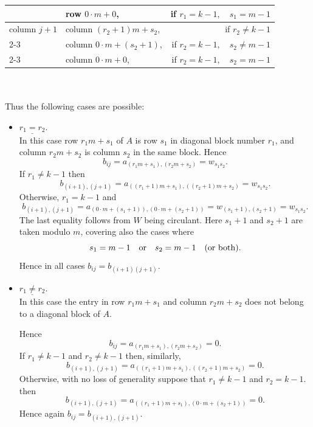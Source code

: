 {{{\begin{pr}
{\begin{tabular}{||l|lr||}
	       & row  $0 \cdot m+0$,   &  if $r_1=k-1, \quad s_1=m-1$         \\ \hline
  column $j+1$ & column  $(r_2+1)m+s_2$,     &  if $r_2 \neq k-1$    \\ \cline{2-3}
	       & column  $0 \cdot m+(s_2+1)$,&  if $r_2=k-1, \quad s_2 \neq m-1$          \\ \cline{2-3}
	       & column  $0 \cdot m+0$,&  if $r_2=k-1, \quad s_2=m-1$          \\ \hline
\end{tabular}
{ \ }\\
{ \ }\\
     
     Thus the following cases are possible:
	
\begin{itemize}
  \item $\underline {r_1=r_2}$.\\
	In this case row $r_1m+s_1$ of $A$ is row $s_1$ in diagonal block number 
	$r_1$, and column $r_2m+s_2$ is column $s_2$ in the same block.  
	Hence
		$$b_{ij}=a_{(r_1m+s_1),(r_2m+s_2)}=w_{s_1s_2}.$$
	If $r_1 \neq k-1$ then
		$$b_{(i+1),(j+1)}=a_{((r_1+1)m+s_1),((r_2+1)m+s_2)}=w_{s_1s_2}.$$           
	Otherwise,  $r_1=k-1$ and 
	   $$b_{(i+1),(j+1)}=a_{(0 \cdot m+(s_1+1)),(0 \cdot m +(s_2+1))}=w_{(s_1+1),(s_2+1)}=w_{s_1s_2}.$$           
	The last equality follows from $W$ being circulant.
	Here $s_1+1$ and $s_2+1$ are taken modulo $m$, covering also the 
	cases  where 
	  $$s_1=m-1 \quad {\rm or} \quad s_2=m-1 \quad ({\rm or \ both}).$$
	Hence in all cases $b_{ij}=b_{(i+1)(j+1)}$.         

  \item $\underline {r_1 \neq r_2}$.\\
	In this case the entry in row $r_1m+s_1$ and column $r_2m+s_2$ 
	does not belong to a diagonal block of $A$. 
	
	
	Hence
		$$b_{ij}=a_{(r_1m+s_1),(r_2m+s_2)}=0.$$
	If $r_1 \neq k-1$ and $r_2 \neq k-1$ then, similarly, 
		$$b_{(i+1),(j+1)}=a_{((r_1+1)m+s_1),((r_2+1)m+s_2)}=0.$$           
	Otherwise, with no loss of generality suppose that 
	$r_1 \neq k-1$ and $r_2=k-1$. then
	$$b_{(i+1),(j+1)}=a_{((r_1+1)m+s_1),(0 \cdot m +(s_2+1))}=0.$$           
	Hence again $b_{ij}=b_{(i+1),(j+1)}$.         
\end{itemize}

}
\end{pr}}}}
